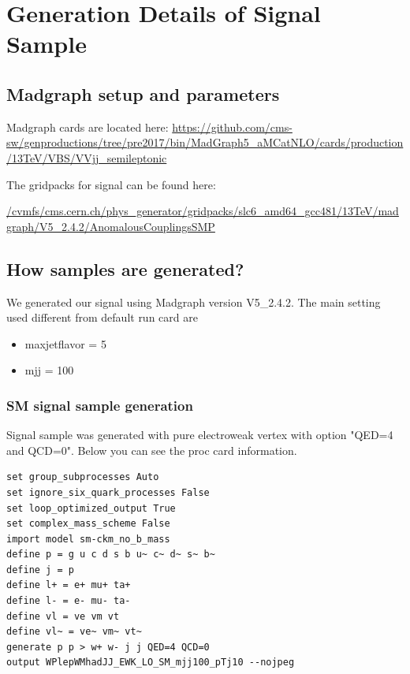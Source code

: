 \section{Generation Details of Signal Sample}
\label{sec:MCsampleGeneration}
\subsection{Madgraph setup and parameters}

\begin{sloppypar}
Madgraph cards are located here: \url{https://github.com/cms-sw/genproductions/tree/pre2017/bin/MadGraph5_aMCatNLO/cards/production/13TeV/VBS/VVjj_semileptonic}
\end{sloppypar}

The gridpacks for signal can be found here:

\begin{sloppypar}
\url{/cvmfs/cms.cern.ch/phys\_generator/gridpacks/slc6\_amd64\_gcc481/13TeV/madgraph/V5\_2.4.2/AnomalousCouplingsSMP}
\end{sloppypar}

\subsection{How samples are generated?}
We generated our signal using Madgraph version V5\_2.4.2. The main setting used different from default run card are 
\begin{itemize}
	\item maxjetflavor = 5
	\item mjj = 100
\end{itemize}

\subsubsection{SM signal sample generation}
Signal sample was generated with pure electroweak vertex with option "QED=4 and QCD=0". Below you can see the proc card information. 

\begin{verbatim}
set group_subprocesses Auto
set ignore_six_quark_processes False
set loop_optimized_output True
set complex_mass_scheme False
import model sm-ckm_no_b_mass
define p = g u c d s b u~ c~ d~ s~ b~
define j = p 
define l+ = e+ mu+ ta+
define l- = e- mu- ta-
define vl = ve vm vt
define vl~ = ve~ vm~ vt~
generate p p > w+ w- j j QED=4 QCD=0 
output WPlepWMhadJJ_EWK_LO_SM_mjj100_pTj10 --nojpeg
\end{verbatim}


